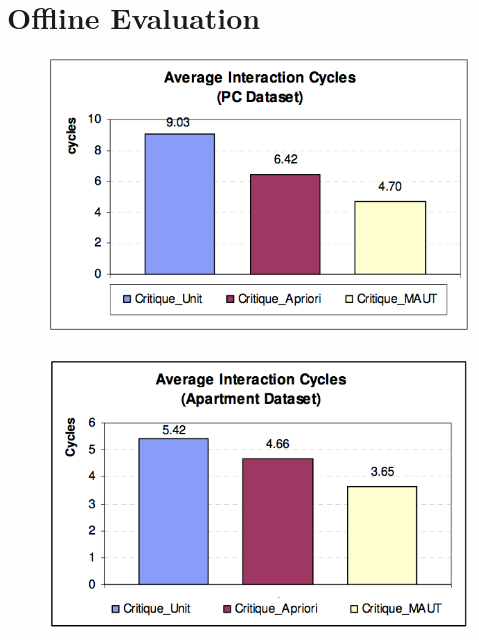 \section{Offline Evaluation}
\label{sec:offline}
\begin{figure}
\centering
\begin{minipage}{.45\textwidth}
  \centering
  \includegraphics[width=1\linewidth]{figures-bharath/pc_results.png}
  \label{fig:pc_results}
\end{minipage}%
\;\;\;\;\;\;
\begin{minipage}{.45\textwidth}
  \centering
  \includegraphics[width=1\linewidth]{figures-bharath/apartment_results.png}
  \label{fig:apartment_results}
\end{minipage}
\end{figure}

